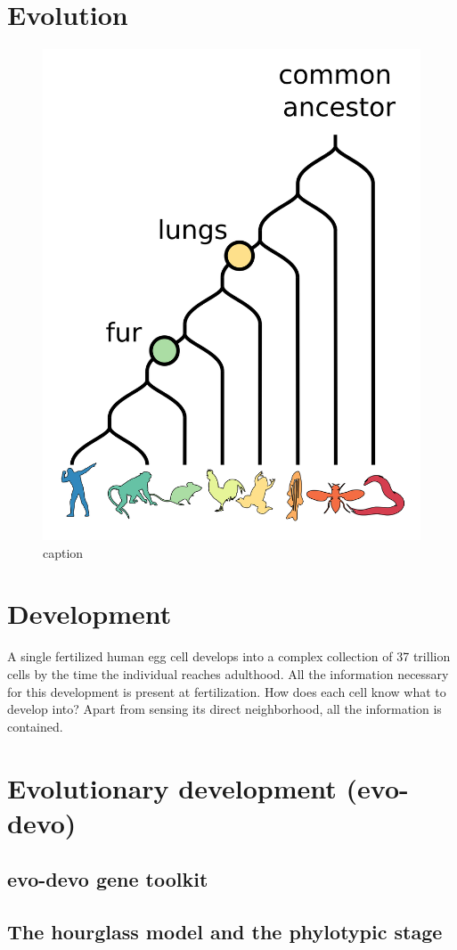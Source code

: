 \section{Evolution}

\begin{figure}[H]
    \includegraphics[width=0.5\linewidth]{ch1.Introduction/imgs/phylogeny.png}
    \caption{caption}
    \label{fig:phylogeny}
\end{figure}

\section{Development}

A single fertilized human egg cell develops into a complex collection of 37 trillion cells by the time the individual reaches adulthood. All the information necessary for this development is present at fertilization. How does each cell know what to develop into? Apart from sensing its direct neighborhood, all the information is contained.

\section{Evolutionary development (evo-devo)}



\subsection{evo-devo gene toolkit}

\subsection{The hourglass model and the phylotypic stage}


